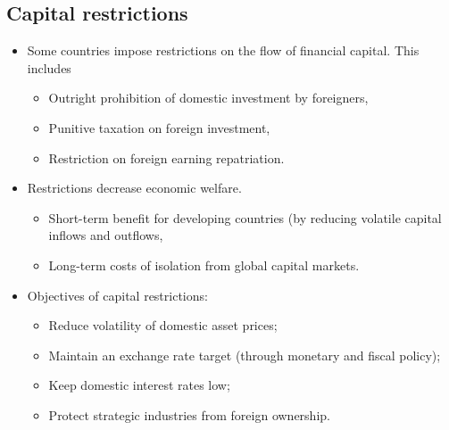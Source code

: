 \documentclass[../notes_compiled.tex]{subfiles}
\begin{document}
\subsection{Capital restrictions}
\begin{itemize}
\item Some countries impose restrictions on the flow of financial capital. This includes
\begin{itemize}
\item Outright prohibition of domestic investment by foreigners,
\item Punitive taxation on foreign investment,
\item Restriction on foreign earning repatriation.
\end{itemize}
\item Restrictions decrease economic welfare.
\begin{itemize}
\item Short-term benefit for developing countries (by reducing volatile capital inflows and outflows,
\item Long-term costs of isolation from global capital markets.
\end{itemize}
\item Objectives of capital restrictions:
\begin{itemize}
\item Reduce volatility of domestic asset prices;
\item Maintain an exchange rate target (through monetary and fiscal policy);
\item Keep domestic interest rates low;
\item Protect strategic industries from foreign ownership.
\end{itemize}
\end{itemize}
\end{document}

